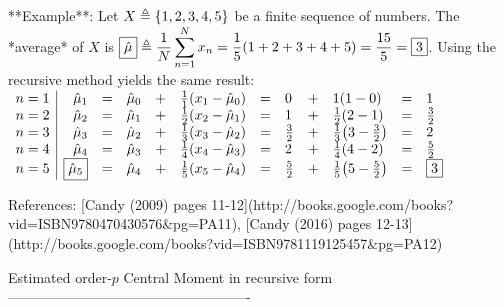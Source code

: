 **Example**:
Let $X \triangleq \left\{1,2,3,4,5\right\}$ be a finite sequence of numbers.
The *average* of $X$ is $\displaystyle
  \boxed{\hat{\mu}} \triangleq \frac{1}{N}\sum_{n=1}^N x_n
                   =    \frac{1}{5}{\left(1+2+3+4+5\right)}
                   =    \frac{15}{5}
                   =    \boxed{3}
$.  
Using the recursive method yields the same result:
$\begin{array}{l|rclcl clcl cl}
  n=1 & \hat{\mu}_1 &=& \hat{\mu}_0   &+& \frac{1}{1}{\left( x_1 - \hat{\mu}_0 \right)}
                   &=& 0            &+&          1 {\left( 1      - 0          \right)}
                   &=& 1\\
  n=2 & \hat{\mu}_2 &=& \hat{\mu}_1   &+& \frac{1}{2}{\left( x_2 - \hat{\mu}_1 \right)}
                   &=& 1            &+& \frac{1}{2}{\left( 2      - 1          \right)}
                   &=& \frac{3}{2} \\
  n=3 & \hat{\mu}_3 &=& \hat{\mu}_2   &+& \frac{1}{3}{\left( x_3 - \hat{\mu}_2 \right)}
                   &=& \frac{3}{2}  &+& \frac{1}{3}{\left( 3      - \frac{3}{2}\right)}
                   &=& 2           \\
  n=4 & \hat{\mu}_4 &=& \hat{\mu}_3   &+& \frac{1}{4}{\left( x_4 - \hat{\mu}_3 \right)}
                   &=& 2            &+& \frac{1}{4}{\left( 4      - 2          \right)}
                   &=& \frac{5}{2} \\
  n=5 & \boxed{\hat{\mu}_5} &=& \hat{\mu}_4   &+& \frac{1}{5}{\left( x_5 - \hat{\mu}_4 \right)}
                   &=& \frac{5}{2}  &+& \frac{1}{5}{\left( 5      - \frac{5}{2}\right)}
                   &=& \boxed{3}
\end{array}$


References: 
[Candy (2009) pages 11-12](http://books.google.com/books?vid=ISBN9780470430576&pg=PA11),
[Candy (2016) pages 12-13](http://books.google.com/books?vid=ISBN9781119125457&pg=PA12)

Estimated order-$p$ Central Moment in recursive form
----------------------------------------------------



